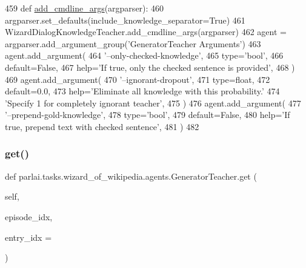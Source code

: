 \begin{DoxyCode}
459     \textcolor{keyword}{def }\hyperlink{namespaceparlai_1_1agents_1_1drqa_1_1config_a62fdd5554f1da6be0cba185271058320}{add\_cmdline\_args}(argparser):
460         argparser.set\_defaults(include\_knowledge\_separator=\textcolor{keyword}{True})
461         WizardDialogKnowledgeTeacher.add\_cmdline\_args(argparser)
462         agent = argparser.add\_argument\_group(\textcolor{stringliteral}{'GeneratorTeacher Arguments'})
463         agent.add\_argument(
464             \textcolor{stringliteral}{'--only-checked-knowledge'},
465             type=\textcolor{stringliteral}{'bool'},
466             default=\textcolor{keyword}{False},
467             help=\textcolor{stringliteral}{'If true, only the checked sentence is provided'},
468         )
469         agent.add\_argument(
470             \textcolor{stringliteral}{'--ignorant-dropout'},
471             type=float,
472             default=0.0,
473             help=\textcolor{stringliteral}{'Eliminate all knowledge with this probability.'}
474             \textcolor{stringliteral}{'Specify 1 for completely ignorant teacher'},
475         )
476         agent.add\_argument(
477             \textcolor{stringliteral}{'--prepend-gold-knowledge'},
478             type=\textcolor{stringliteral}{'bool'},
479             default=\textcolor{keyword}{False},
480             help=\textcolor{stringliteral}{'If true, prepend text with checked sentence'},
481         )
482 
\end{DoxyCode}
\mbox{\label{classparlai_1_1tasks_1_1wizard__of__wikipedia_1_1agents_1_1GeneratorTeacher_abf361a076410dda7b42127be420611d9}} 
\subsubsection{\texorpdfstring{get()}{get()}}
{\footnotesize\ttfamily def parlai.\+tasks.\+wizard\+\_\+of\+\_\+wikipedia.\+agents.\+Generator\+Teacher.\+get (\begin{DoxyParamCaption}\item[{}]{self,  }\item[{}]{episode\+\_\+idx,  }\item[{}]{entry\+\_\+idx = {} }\end{DoxyParamCaption})}



